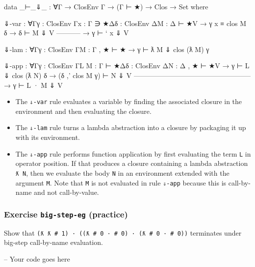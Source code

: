 \begin{fence}
\begin{code}
data _⊢_⇓_ : ∀{Γ} → ClosEnv Γ → (Γ ⊢ ★) → Clos → Set where

  ⇓-var : ∀{Γ}{γ : ClosEnv Γ}{x : Γ ∋ ★}{Δ}{δ : ClosEnv Δ}{M : Δ ⊢ ★}{V}
    → γ x ≡ clos M δ
    → δ ⊢ M ⇓ V
      -----------
    → γ ⊢ ` x ⇓ V

  ⇓-lam : ∀{Γ}{γ : ClosEnv Γ}{M : Γ , ★ ⊢ ★}
    → γ ⊢ ƛ M ⇓ clos (ƛ M) γ

  ⇓-app : ∀{Γ}{γ : ClosEnv Γ}{L M : Γ ⊢ ★}{Δ}{δ : ClosEnv Δ}{N : Δ , ★ ⊢ ★}{V}
    → γ ⊢ L ⇓ clos (ƛ N) δ   →   (δ ,' clos M γ) ⊢ N ⇓ V
      ---------------------------------------------------
    → γ ⊢ L · M ⇓ V
\end{code}
\end{fence}

\begin{itemize}
\item
  The \texttt{⇓-var} rule evaluates a variable by finding the associated
  closure in the environment and then evaluating the closure.
\item
  The \texttt{⇓-lam} rule turns a lambda abstraction into a closure by
  packaging it up with its environment.
\item
  The \texttt{⇓-app} rule performs function application by first
  evaluating the term \texttt{L} in operator position. If that produces
  a closure containing a lambda abstraction \texttt{ƛ\ N}, then we
  evaluate the body \texttt{N} in an environment extended with the
  argument \texttt{M}. Note that \texttt{M} is not evaluated in rule
  \texttt{⇓-app} because this is call-by-name and not call-by-value.
\end{itemize}

\hypertarget{exercise-big-step-eg-practice}{%
\subsubsection{\texorpdfstring{Exercise \texttt{big-step-eg}
(practice)}{Exercise big-step-eg (practice)}}\label{exercise-big-step-eg-practice}}

Show that
\texttt{(ƛ\ ƛ\ \#\ 1)\ ·\ ((ƛ\ \#\ 0\ ·\ \#\ 0)\ ·\ (ƛ\ \#\ 0\ ·\ \#\ 0))}
terminates under big-step call-by-name evaluation.

\begin{fence}
\begin{code}
-- Your code goes here
\end{code}
\end{fence}

